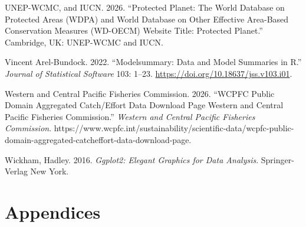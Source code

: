 \documentclass[
  letterpaper,
  DIV=11,
  numbers=noendperiod]{scrartcl}
\newlength{\cslhangindent}
\newenvironment{CSLReferences}[2] %
 {\begin{list}{}{%
  \setlength{\itemindent}{0pt}
  \setlength{\leftmargin}{0pt}
  \setlength{\parsep}{0pt}
  \ifodd #1
   \setlength{\leftmargin}{\cslhangindent}
   \setlength{\itemindent}{-1\cslhangindent}
  \fi
  \setlength{\itemsep}{#2\baselineskip}}}
 {\end{list}}
\begin{document}
\begin{CSLReferences}{1}{0}
UNEP-WCMC, and IUCN. 2026. {``Protected {Planet}: {The World Database}
on {Protected Areas} ({WDPA}) and {World Database} on {Other Effective
Area}-Based {Conservation Measures} ({WD-OECM}) {Website Title}:
{Protected Planet}.''} Cambridge, UK: {UNEP-WCMC and IUCN}.

Vincent Arel-Bundock. 2022. {``Modelsummary: {Data} and {Model
Summaries} in {R}.''} \emph{Journal of Statistical Software} 103: 1--23.
\url{https://doi.org/10.18637/jss.v103.i01}.

Western and Central Pacific Fisheries Commission. 2026. {``{WCPFC Public
Domain Aggregated Catch}/{Effort} Data Download Page \textbar{}
{Western} and {Central Pacific Fisheries Commission}.''} \emph{Western
and Central Pacific Fisheries Commission}.
https://www.wcpfc.int/sustainability/scientific-data/wcpfc-public-domain-aggregated-catcheffort-data-download-page.

Wickham, Hadley. 2016. \emph{Ggplot2: {Elegant Graphics} for {Data
Analysis}}. Springer-Verlag New York.

\end{CSLReferences}

\section{Appendices}\label{appendices}
\end{document}
